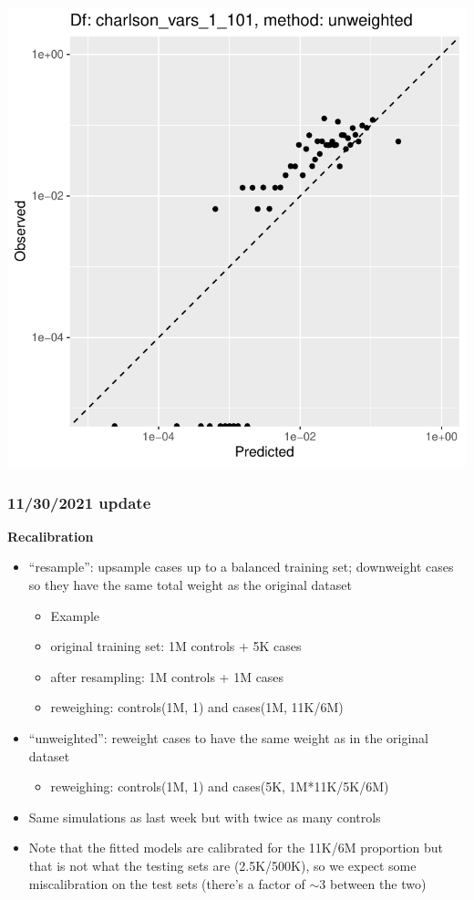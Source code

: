 \documentclass[12pt]{article}
\begin{document}
\begin{center}
\includegraphics[width=.45\textwidth]{calibration_curves/unweighted_charlson_vars_1_101_log.pdf}
\end{center}



\pagebreak
\subsubsection*{11/30/2021 update}

\textbf{Recalibration}
\begin{itemize}
	\item ``resample'': upsample cases up to a balanced training set; downweight cases so they have the same total weight as the original dataset
	\begin{itemize}
		\item Example
		\item original training set: 1M controls + 5K cases
		\item after resampling: 1M controls + 1M cases
		\item reweighing: controls(1M, 1) and cases(1M, 11K/6M)
	\end{itemize}
	\item ``unweighted'': reweight cases to have the same weight as in the original dataset
	\begin{itemize}
		\item reweighing: controls(1M, 1) and cases(5K, 1M*11K/5K/6M)
	\end{itemize}
	\item Same simulations as last week but with twice as many controls
	\item Note that the fitted models are calibrated for the 11K/6M proportion
	but that is not what the testing sets are (2.5K/500K), so we expect some miscalibration on the test sets (there's a factor of $\sim 3$ between the two)
\end{itemize}
\end{document}
